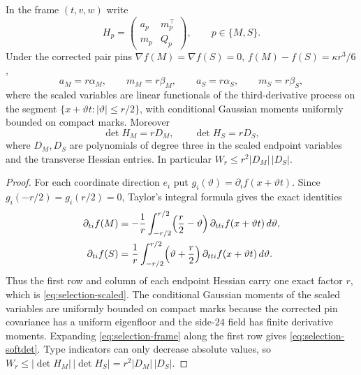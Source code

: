 \begin{lemma}\label{lem:selection-endpoint}
In the frame $(t,v,w)$ write
\begin{equation}\label{eq:selection-frame}
H_p=\begin{pmatrix}a_p&m_p^{\top}\\ m_p&Q_p\end{pmatrix},\qquad p\in\{M,S\}.
\end{equation}
Under the corrected pair pins $\nabla f(M)=\nabla f(S)=0$, $f(M)-f(S)=\kappa r^3/6$,
\begin{equation}\label{eq:selection-scaled}
a_M=r\alpha_M,\qquad m_M=r\beta_M,\qquad a_S=r\alpha_S,\qquad m_S=r\beta_S,
\end{equation}
where the scaled variables are linear functionals of the third-derivative process on the segment $\{x+\vartheta t:|\vartheta|\le r/2\}$, with conditional Gaussian moments uniformly bounded on compact marks. Moreover
\begin{equation}\label{eq:selection-softdet}
\det H_M=rD_M,\qquad\det H_S=rD_S,
\end{equation}
where $D_M,D_S$ are polynomials of degree three in the scaled endpoint variables and the transverse Hessian entries. In particular $W_r\le r^2|D_M|\,|D_S|$.
\end{lemma}

\begin{proof}
For each coordinate direction $e_i$ put $g_i(\vartheta)=\partial_if(x+\vartheta t)$. Since $g_i(-r/2)=g_i(r/2)=0$, Taylor's integral formula gives the exact identities
\begin{equation}\label{eq:selection-taylor}
\begin{aligned}
\partial_{ti}f(M)&=-\frac1r\int_{-r/2}^{r/2}\Bigl(\frac r2-\vartheta\Bigr)\,\partial_{tti}f(x+\vartheta t)\,d\vartheta,\\
\partial_{ti}f(S)&=\frac1r\int_{-r/2}^{r/2}\Bigl(\vartheta+\frac r2\Bigr)\,\partial_{tti}f(x+\vartheta t)\,d\vartheta .
\end{aligned}
\end{equation}
Thus the first row and column of each endpoint Hessian carry one exact factor $r$, which is \eqref{eq:selection-scaled}. The conditional Gaussian moments of the scaled variables are uniformly bounded on compact marks because the corrected pin covariance has a uniform eigenfloor and the side-$24$ field has finite derivative moments. Expanding \eqref{eq:selection-frame} along the first row gives \eqref{eq:selection-softdet}. Type indicators can only decrease absolute values, so $W_r\le|\det H_M|\,|\det H_S|=r^2|D_M|\,|D_S|$.
\end{proof}


